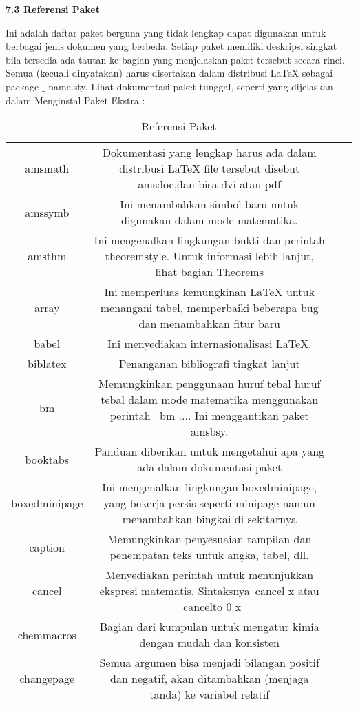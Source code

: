 \vspace{12pt}
\noindent \textbf{7.3 Referensi Paket}\par
Ini adalah daftar paket berguna yang tidak lengkap dapat digunakan untuk berbagai jenis dokumen yang berbeda. Setiap paket memiliki deskripsi singkat bila tersedia ada tautan ke bagian yang menjelaskan paket tersebut secara rinci. Semua (kecuali dinyatakan) harus disertakan dalam distribusi LaTeX sebagai package $ \_ $ name.sty. Lihat dokumentasi paket tunggal, seperti yang dijelaskan dalam Menginstal Paket Ekstra :\par

\begin{table}[ht]
	\caption{Referensi Paket}
	\centering
	\begin{tabular}{cccc}
		\hline
		amsmath&Dokumentasi yang lengkap harus ada dalam distribusi LaTeX file tersebut disebut amsdoc,dan bisa dvi atau pdf&\\
		amssymb&Ini menambahkan simbol baru untuk digunakan dalam mode matematika.&\\
		amsthm&Ini mengenalkan lingkungan bukti dan perintah theoremstyle. Untuk informasi lebih lanjut, lihat bagian Theorems&\\
		array&Ini memperluas kemungkinan LaTeX untuk menangani tabel, memperbaiki beberapa bug dan menambahkan fitur baru&\\
		babel&Ini menyediakan internasionalisasi LaTeX. &\\
		biblatex&Penanganan bibliografi tingkat lanjut&\\
		bm&Memungkinkan penggunaan huruf tebal huruf tebal dalam mode matematika menggunakan perintah \ bm {...}. Ini menggantikan paket amsbsy.&\\
		booktabs&Panduan diberikan untuk mengetahui apa yang ada dalam dokumentasi paket&\\
		boxedminipage&Ini mengenalkan lingkungan boxedminipage, yang bekerja persis seperti minipage namun menambahkan bingkai di sekitarnya&\\
		caption&Memungkinkan penyesuaian tampilan dan penempatan teks untuk angka, tabel, dll.&\\
		cancel&Menyediakan perintah untuk menunjukkan ekspresi matematis. Sintaksnya\ cancel {x} atau \ cancelto {0} {x}&\\
		chemmacros&Bagian dari kumpulan untuk mengatur kimia dengan mudah dan konsisten&\\
		changepage&Semua argumen bisa menjadi bilangan positif dan negatif, akan ditambahkan (menjaga tanda) ke variabel relatif&\\

\end{tabular}
\end{table}
